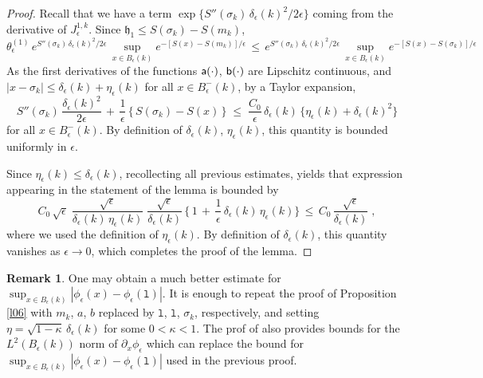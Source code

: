 \documentclass[reqno]{amsart}
\theoremstyle{plain}
\theoremstyle{definition}
\newtheorem{remark}[theorem]{Remark}
\newcommand{\mf}[1]{{\mathfrak #1}}
\newcommand{\mss}[1]{{\textsf #1}}
\newcommand{\mtt}[1]{{\mathtt #1}}
\newcounter{as}[section]
\newcommand{\<}{\langle}
\renewcommand{\>}{\rangle}
\begin{document}
\begin{proof}
Recall that we have a term
$\exp\{S''(\sigma_k) \, \delta_\epsilon(k)^2/2 \epsilon \}$ coming
from the derivative of $J^{1,k}_\epsilon$.  Since
$\mf h_1 \le S(\sigma_k) - S(m_k)$,
\begin{equation*}
\theta_{\epsilon}^{(1)}\,
e^{S''(\sigma_k) \, \delta_\epsilon(k)^2/2 \epsilon } \,
\sup_{x\in B_\epsilon  (k)} e^{-[S(x)-S(m_k)]/\epsilon}
\,\le\,
e^{S''(\sigma_k) \, \delta_\epsilon(k)^2/2 \epsilon } \,
\sup_{x\in B_\epsilon  (k)} e^{-[S(x)-S(\sigma_k)]/\epsilon}
\end{equation*}
As the first derivatives of the functions $\mss a(\cdot)$,
$\mss b(\cdot)$ are Lipschitz continuous, and
$|x-\sigma_k|\le \delta_\epsilon(k) + \eta_\epsilon(k)$ for all
$x\in B^-_\epsilon(k)$, by a Taylor expansion,
\begin{equation*}
S''(\sigma_k) \, \frac{\delta_\epsilon(k)^2}{2 \epsilon}
\,+\, \frac{1}{\epsilon}\, \big\{\, S(\sigma_k) - S(x)\,\big\}
\;\le\; \frac{C_0}{\epsilon} \, \delta_\epsilon(k) \,
\{\eta_\epsilon(k)  + \delta_\epsilon(k)^2\}
\end{equation*}
for all $x\in B^-_\epsilon(k)$. By definition of
$\delta_\epsilon(k)$, $\eta_\epsilon(k)$, this quantity is bounded
uniformly in $\epsilon$.

Since $\eta_\epsilon(k) \le \delta_\epsilon(k)$, recollecting all
previous estimates, yields that expression appearing in the statement
of the lemma is bounded by
\begin{equation*}
C_0\, \sqrt{\epsilon}\; \frac{\sqrt{\epsilon}}
{\delta_\epsilon(k) \, \eta_\epsilon(k)}  \;
\frac{\sqrt{\epsilon}}{\delta_\epsilon(k)} \, \Big\{\, 1  \,+\,
\frac{1}{\epsilon}\, \delta_\epsilon(k)\,
\eta_\epsilon(k) \Big\} \,\le\,
C_0\, \frac{\sqrt{\epsilon}}{\delta_\epsilon(k)}\;,
\end{equation*}
where we used the definition of $\eta_\epsilon(k)$.  By definition of
$\delta_\epsilon(k)$, this quantity vanishes as $\epsilon\to 0$, which
completes the proof of the lemma.
\end{proof}

\begin{remark}
One may obtain a much better estimate for
$\sup_{x\in B_\epsilon (k)} |\phi_{\epsilon} (x) - \phi_{\epsilon}
(\mtt l)|$. It is enough to repeat the proof of Proposition \ref{l06}
with $m_k$, $a$, $b$ replaced by $\mtt l$, $\mtt l$, $\sigma_k$,
respectively, and setting
$\eta = \sqrt{1-\kappa} \, \delta_\epsilon(k)$ for some $0<\kappa<1$.
The prof of \cite[Theorem 6.3.1]{le} also provides bounds for the
$L^2(B_\epsilon(k))$ norm of $\partial_x \phi_\epsilon$ which can
replace the bound for
$\sup_{x\in B_\epsilon (k)} |\phi_{\epsilon} (x) - \phi_{\epsilon}
(\mtt l)|$ used in the previous proof.
\end{remark}
\end{document}
